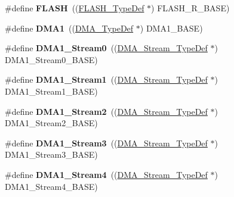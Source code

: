 \begin{DoxyCompactItemize}
\mbox{\label{group___peripheral__declaration_ga844ea28ba1e0a5a0e497f16b61ea306b}} 
\#define {\bfseries F\+L\+A\+SH}~((\hyperlink{struct_f_l_a_s_h___type_def}{F\+L\+A\+S\+H\+\_\+\+Type\+Def} $\ast$) F\+L\+A\+S\+H\+\_\+\+R\+\_\+\+B\+A\+SE)
\item 
\mbox{\label{group___peripheral__declaration_gacc16d2a5937f7585320a98f7f6b578f9}} 
\#define {\bfseries D\+M\+A1}~((\hyperlink{struct_d_m_a___type_def}{D\+M\+A\+\_\+\+Type\+Def} $\ast$) D\+M\+A1\+\_\+\+B\+A\+SE)
\item 
\mbox{\label{group___peripheral__declaration_ga61247dd5d594289c404dd8774202dfd8}} 
\#define {\bfseries D\+M\+A1\+\_\+\+Stream0}~((\hyperlink{struct_d_m_a___stream___type_def}{D\+M\+A\+\_\+\+Stream\+\_\+\+Type\+Def} $\ast$) D\+M\+A1\+\_\+\+Stream0\+\_\+\+B\+A\+SE)
\item 
\mbox{\label{group___peripheral__declaration_gaf7d82f110f19982d483eebc465d222b2}} 
\#define {\bfseries D\+M\+A1\+\_\+\+Stream1}~((\hyperlink{struct_d_m_a___stream___type_def}{D\+M\+A\+\_\+\+Stream\+\_\+\+Type\+Def} $\ast$) D\+M\+A1\+\_\+\+Stream1\+\_\+\+B\+A\+SE)
\item 
\mbox{\label{group___peripheral__declaration_gad0e2140b8eeec3594035f1a7bf2a7250}} 
\#define {\bfseries D\+M\+A1\+\_\+\+Stream2}~((\hyperlink{struct_d_m_a___stream___type_def}{D\+M\+A\+\_\+\+Stream\+\_\+\+Type\+Def} $\ast$) D\+M\+A1\+\_\+\+Stream2\+\_\+\+B\+A\+SE)
\item 
\mbox{\label{group___peripheral__declaration_ga96ac1af7a92469fe86a9fbdec091f25d}} 
\#define {\bfseries D\+M\+A1\+\_\+\+Stream3}~((\hyperlink{struct_d_m_a___stream___type_def}{D\+M\+A\+\_\+\+Stream\+\_\+\+Type\+Def} $\ast$) D\+M\+A1\+\_\+\+Stream3\+\_\+\+B\+A\+SE)
\item 
\mbox{\label{group___peripheral__declaration_ga87df45f4b82e0b3a8c1b17f1a77aecdb}} 
\#define {\bfseries D\+M\+A1\+\_\+\+Stream4}~((\hyperlink{struct_d_m_a___stream___type_def}{D\+M\+A\+\_\+\+Stream\+\_\+\+Type\+Def} $\ast$) D\+M\+A1\+\_\+\+Stream4\+\_\+\+B\+A\+SE)

\end{DoxyCompactItemize}
